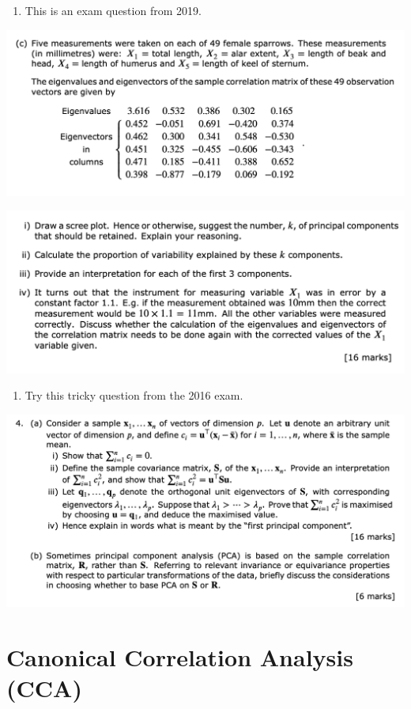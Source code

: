 \documentclass[
]{book}
\providecommand{\tightlist}{%
  \setlength{\itemsep}{0pt}\setlength{\parskip}{0pt}}
\theoremstyle{definition}
\theoremstyle{definition}
\theoremstyle{definition}
\theoremstyle{definition}
\theoremstyle{remark}
\begin{document}
\begin{enumerate}
\def\labelenumi{\arabic{enumi}.}
\setcounter{enumi}{5}
\tightlist
\item
  This is an exam question from 2019.
\end{enumerate}

\includegraphics{PCA_Q4_2018_19a.png}

\includegraphics{PCA_Q4_2018_19b.png}

\begin{enumerate}
\def\labelenumi{\arabic{enumi}.}
\setcounter{enumi}{6}
\tightlist
\item
  Try this tricky question from the 2016 exam.
\end{enumerate}

\includegraphics{PCA_Q4_2015_16_short.png}

\chapter{Canonical Correlation Analysis (CCA)}\label{cca}
\end{document}

